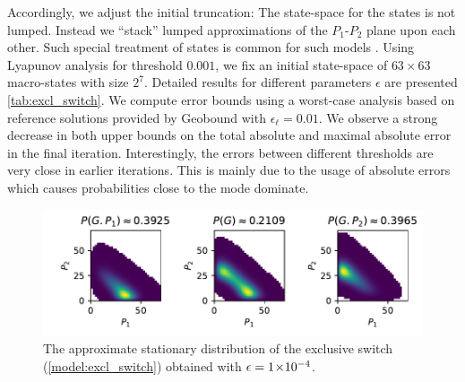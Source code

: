 Accordingly, we adjust
the initial truncation:
The state-space for the  states is not lumped. Instead we ``stack''
lumped approximations of the $P_1$-$P_2$ plane upon each other.
Such special treatment of  states is common for such
models \parencite{lapin2011shave}.
Using Lyapunov analysis for threshold $0.001$, we fix an initial
state-space of $63\times 63$ macro-states with size $2^7$. Detailed
results for different parameters $\epsilon$ are presented
\autoref{tab:excl_switch}.
We compute error bounds using a worst-case analysis based on
reference solutions provided by Geobound with $\epsilon_{\ell}=0.01$.
We observe a strong decrease in both upper bounds on the total
absolute and maximal absolute error in the final iteration.
Interestingly, the errors between different thresholds are very close
in earlier iterations.
This is mainly due to the usage of absolute errors which causes
probabilities close to the mode dominate.
\begin{figure}[htbp]
  \centering
  \includegraphics[width=\textwidth]{gfx/gexpr_approx.pdf}
  \caption[Approximate stationary distribution of the exclusive
  switch]{The approximate stationary distribution of the exclusive
  switch (\autoref{model:excl_switch}) obtained with $\epsilon= 1\!\times\hspace{-.5ex} 10^{-4} $.}
  \label{fig:excl_switch:excl_switch_dist}
\end{figure}

